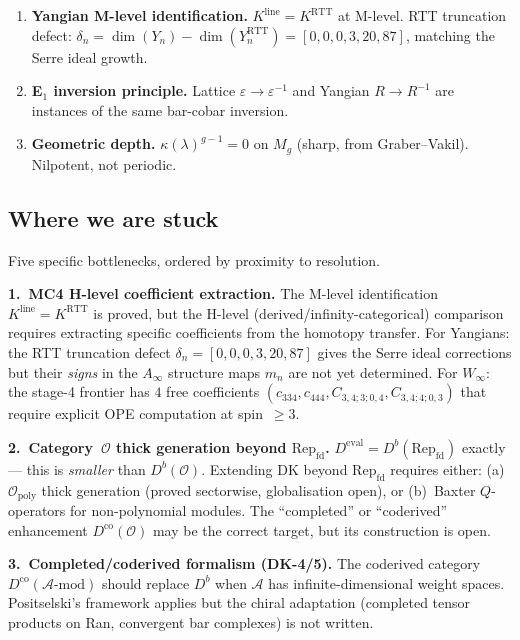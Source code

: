 \documentclass[11pt]{article}
\newcommand{\cA}{\mathcal{A}}
\newcommand{\cO}{\mathcal{O}}
\begin{document}
\begin{enumerate}[label=(\roman*)]
\item \textbf{Yangian M-level identification.}
  $K^{\mathrm{line}} = K^{\mathrm{RTT}}$ at M-level.
  RTT truncation defect: $\delta_n = \dim(Y_n) - \dim(Y_n^{\mathrm{RTT}})
  = [0,0,0,3,20,87]$, matching the Serre ideal growth.

\item \textbf{E$_1$ inversion principle.}
  Lattice $\varepsilon \to \varepsilon^{-1}$ and Yangian
  $R \to R^{-1}$ are instances of the same bar-cobar inversion.

\item \textbf{Geometric depth.}
  $\kappa(\lambda)^{g-1} = 0$ on $M_g$ (sharp, from Graber--Vakil).
  Nilpotent, not periodic.
\end{enumerate}


\subsection{Where we are stuck}

Five specific bottlenecks, ordered by proximity to resolution.

\medskip\noindent
\textbf{1.\ MC4 H-level coefficient extraction.}
The M-level identification $K^{\mathrm{line}} = K^{\mathrm{RTT}}$ is
proved, but the H-level (derived/infinity-categorical) comparison
requires extracting specific coefficients from the homotopy transfer.
For Yangians: the RTT truncation defect $\delta_n = [0,0,0,3,20,87]$
gives the Serre ideal corrections but their \emph{signs} in the
$A_\infty$ structure maps $m_n$ are not yet determined.
For $W_\infty$: the stage-4 frontier has $4$ free coefficients
$(c_{334}, c_{444}, C_{3,4;3;0,4}, C_{3,4;4;0,3})$ that require
explicit OPE computation at spin~$\geq 3$.

\medskip\noindent
\textbf{2.\ Category~$\cO$ thick generation beyond $\mathrm{Rep}_{\mathrm{fd}}$.}
$D^{\mathrm{eval}} = D^b(\mathrm{Rep}_{\mathrm{fd}})$ exactly ---
this is \emph{smaller} than $D^b(\cO)$.  Extending DK beyond
$\mathrm{Rep}_{\mathrm{fd}}$ requires either: (a)~$\cO_{\mathrm{poly}}$
thick generation (proved sectorwise, globalisation open), or
(b)~Baxter $Q$-operators for non-polynomial modules.  The
``completed'' or ``coderived'' enhancement $D^{\mathrm{co}}(\cO)$ may
be the correct target, but its construction is open.

\medskip\noindent
\textbf{3.\ Completed/coderived formalism (DK-4/5).}
The coderived category $D^{\mathrm{co}}(\cA\text{-mod})$ should
replace $D^b$ when $\cA$ has infinite-dimensional weight spaces.
Positselski's framework applies but the chiral adaptation (completed
tensor products on Ran, convergent bar complexes) is not written.
\end{document}

